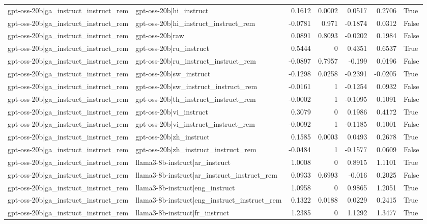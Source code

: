 \begin{table}
\begin{tabular}{l l r r r r l}
gpt-oss-20b|ga_instruct_instruct_rem & gpt-oss-20b|hi_instruct & 0.1612 & 0.0002 & 0.0517 & 0.2706 & True \\
gpt-oss-20b|ga_instruct_instruct_rem & gpt-oss-20b|hi_instruct_instruct_rem & -0.0781 & 0.971 & -0.1874 & 0.0312 & False \\
gpt-oss-20b|ga_instruct_instruct_rem & gpt-oss-20b|raw & 0.0891 & 0.8093 & -0.0202 & 0.1984 & False \\
gpt-oss-20b|ga_instruct_instruct_rem & gpt-oss-20b|ru_instruct & 0.5444 & 0 & 0.4351 & 0.6537 & True \\
gpt-oss-20b|ga_instruct_instruct_rem & gpt-oss-20b|ru_instruct_instruct_rem & -0.0897 & 0.7957 & -0.199 & 0.0196 & False \\
gpt-oss-20b|ga_instruct_instruct_rem & gpt-oss-20b|sw_instruct & -0.1298 & 0.0258 & -0.2391 & -0.0205 & True \\
gpt-oss-20b|ga_instruct_instruct_rem & gpt-oss-20b|sw_instruct_instruct_rem & -0.0161 & 1 & -0.1254 & 0.0932 & False \\
gpt-oss-20b|ga_instruct_instruct_rem & gpt-oss-20b|th_instruct_instruct_rem & -0.0002 & 1 & -0.1095 & 0.1091 & False \\
gpt-oss-20b|ga_instruct_instruct_rem & gpt-oss-20b|vi_instruct & 0.3079 & 0 & 0.1986 & 0.4172 & True \\
gpt-oss-20b|ga_instruct_instruct_rem & gpt-oss-20b|vi_instruct_instruct_rem & -0.0092 & 1 & -0.1185 & 0.1001 & False \\
gpt-oss-20b|ga_instruct_instruct_rem & gpt-oss-20b|zh_instruct & 0.1585 & 0.0003 & 0.0493 & 0.2678 & True \\
gpt-oss-20b|ga_instruct_instruct_rem & gpt-oss-20b|zh_instruct_instruct_rem & -0.0484 & 1 & -0.1577 & 0.0609 & False \\
gpt-oss-20b|ga_instruct_instruct_rem & llama3-8b-instruct|ar_instruct & 1.0008 & 0 & 0.8915 & 1.1101 & True \\
gpt-oss-20b|ga_instruct_instruct_rem & llama3-8b-instruct|ar_instruct_instruct_rem & 0.0933 & 0.6993 & -0.016 & 0.2025 & False \\
gpt-oss-20b|ga_instruct_instruct_rem & llama3-8b-instruct|eng_instruct & 1.0958 & 0 & 0.9865 & 1.2051 & True \\
gpt-oss-20b|ga_instruct_instruct_rem & llama3-8b-instruct|eng_instruct_instruct_rem & 0.1322 & 0.0188 & 0.0229 & 0.2415 & True \\
gpt-oss-20b|ga_instruct_instruct_rem & llama3-8b-instruct|fr_instruct & 1.2385 & 0 & 1.1292 & 1.3477 & True \\

\end{tabular}
\end{table}

